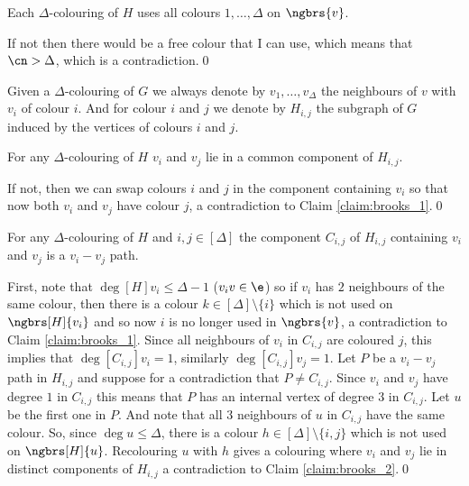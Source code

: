 \begin{prf}
\begin{itemize}
        \begin{customclaim}{1}
        \label{claim:brooks_1}
            Each $\Delta$-colouring of $H$ uses all colours $1, \dots, \Delta$ on $\ngbrs{v}$.
        \end{customclaim}
        \begin{prf}
            If not then there would be a free colour that I can use, which means that $\cn > \Delta$, which is a contradiction.\qed
        \end{prf}
        Given a $\Delta$-colouring of $G$ we always denote by $v_1, \dots, v_\Delta$ the neighbours of $v$ with $v_i$ of colour $i$. And for colour $i$ and $j$ we denote by $H_{i, j}$ the subgraph of $G$ induced by the vertices of colours $i$ and $j$.
        \begin{customclaim}{2}
        \label{claim:brooks_2}
            For any $\Delta$-colouring of $H$ $v_i$ and $v_j$ lie in a common component of $H_{i, j}$.
        \end{customclaim}
        \begin{prf}
            If not, then we can swap colours $i$ and $j$ in the component containing $v_i$ so that now both $v_i$ and $v_j$ have colour $j$, a contradiction to Claim \ref{claim:brooks_1}.\qed
        \end{prf}
        \begin{customclaim}{3}
        \label{claim:brooks_3}
            For any $\Delta$-colouring of $H$ and $i, j \in [\Delta]$ the component $C_{i, j}$ of $H_{i, j}$ containing $v_i$ and $v_j$ is a $v_i - v_j$ path.
        \end{customclaim}
        \begin{prf}
            First, note that $\deg[H]{v_i} \leq \Delta - 1$ ($v_iv \in \e$) so if $v_i$ has $2$ neighbours of the same colour, then there is a colour $k \in [\Delta] \setminus \{i\}$ which is not used on $\ngbrs[H]{v_i}$ and so now $i$ is no longer used in $\ngbrs{v}$, a contradiction to Claim \ref{claim:brooks_1}. Since all neighbours of $v_i$ in $C_{i, j}$ are coloured $j$, this implies that $\deg[C_{i, j}]{v_i} = 1$, similarly $\deg[C_{i, j}]{v_j} = 1$. Let $P$ be a $v_i - v_j$ path in $H_{i, j}$ and suppose for a contradiction that $P \neq C_{i, j}$. Since $v_i$ and $v_j$ have degree $1$ in $C_{i, j}$ this means that $P$ has an internal vertex of degree $3$ in $C_{i, j}$. Let $u$ be the first one in $P$. And note that all $3$ neighbours of $u$ in $C_{i, j}$ have the same colour. So, since $\deg{u} \leq \Delta$, there is a colour $h \in [\Delta] \setminus \{i, j\}$ which is not used on $\ngbrs[H]{u}$. Recolouring $u$ with $h$ gives a colouring where $v_i$ and $v_j$ lie in distinct components of $H_{i, j}$ a contradiction to Claim \ref{claim:brooks_2}.\qed
        \end{prf}
    \end{itemize}
\end{prf}